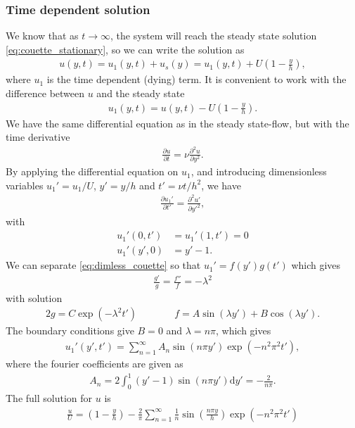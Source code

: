 \documentclass[a4paper,10pt]{article}
\renewcommand{\(}{\left(}
\renewcommand{\)}{\right)}
\newcommand{\dm}[1]{\text{d}#1}
\newcommand{\dpart}[2]{\frac{\partial#1}{\partial#2}}
\newcommand{\dpartt}[2]{\frac{\partial^2#1}{\partial#2^2}}
\begin{document}
\subsubsection{Time dependent solution}
We know that as $t\rightarrow\infty$, the system will reach the steady state solution \eqref{eq:couette_stationary}, so we can write the solution as
\begin{align*}
  u(y,t) = u_1(y,t) + u_s(y) = u_1(y,t) + U\left(1 - \frac{y}{h}\right),
\end{align*}
where $u_1$ is the time dependent (dying) term. It is convenient to work with the difference between $u$ and the steady state
\begin{align*}
  u_1(y,t) = u(y,t) - U\left(1 - \frac{y}{h}\right).
\end{align*}
We have the same differential equation as in the steady state-flow, but with the time derivative
\begin{align*}
  \dpart{u}{t} = \nu\dpartt{u}{y}.
\end{align*}
By applying the differential equation on $u_1$, and introducing dimensionless variables $u_1' = u_1/U$, $y' = y/h$ and $t' = \nu t/h^2$, we have
\begin{align}
  \label{eq:dimless_couette}
  \dpart{u_1'}{t'} = \dpartt{u'}{y'},
\end{align}
with 
\begin{align*}
  u_1'(0,t') &= u_1'(1,t') = 0\\
  u_1'(y',0) &= y' - 1.
\end{align*}
We can separate \eqref{eq:dimless_couette} so that $u_1' = f(y')g(t')$ which gives
\begin{align*}
  \frac{g'}{g} = \frac{f''}{f} = -\lambda^2
\end{align*}
with solution
\begin{alignat*}{2}
  g = C\exp(-\lambda^2t') & \qquad\quad f = A\sin(\lambda y') + B\cos(\lambda y').
\end{alignat*}
The boundary conditions give $B=0$ and $\lambda=n\pi$, which gives
\begin{align*}
  u_1'(y',t') = \sum_{n=1}^\infty A_n \sin\left(n\pi y'\right)\exp\left(-n^2\pi^2t'\right),
\end{align*}
where the fourier coefficients are given as
\begin{align*}
  A_n = 2\int_{0}^1 (y' - 1)\sin\left(n\pi y'\right) \dm y' = -\frac{2}{n\pi}.
\end{align*}
The full solution for $u$ is
\begin{align}
  \frac{u}{U} = \left(1 - \frac{y}{h}\right) - \frac{2}{\pi}\sum_{n=1}^\infty \frac{1}{n} \sin\left(\frac{n\pi y}{h}\right)\exp\left(-n^2\pi^2 t'\right)
\end{align}
\end{document}
